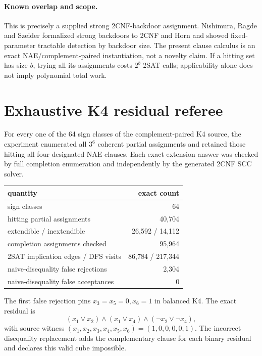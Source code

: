 \documentclass[11pt]{article}
\begin{document}
\paragraph{Known overlap and scope.}
This is precisely a supplied strong 2CNF-backdoor assignment.  Nishimura,
Ragde and Szeider formalized strong backdoors to 2CNF and Horn and showed
fixed-parameter tractable detection by backdoor size.  The present clause
calculus is an exact NAE/complement-paired instantiation, not a novelty claim.
If a hitting set has size $b$, trying all its assignments costs $2^b$ 2SAT
calls; applicability alone does not imply polynomial total work.

\section{Exhaustive K4 residual referee}

For every one of the 64 sign classes of the complement-paired K4 source, the
experiment enumerated all $3^6$ coherent partial assignments and retained
those hitting all four designated NAE clauses.  Each exact extension answer
was checked by full completion enumeration and independently by the generated
2CNF SCC solver.

\begin{center}
\begin{tabular}{lr}
\toprule
quantity & exact count\\
\midrule
sign classes &64\\
hitting partial assignments &40,704\\
extendible / inextendible &26,592 / 14,112\\
completion assignments checked &95,964\\
2SAT implication edges / DFS visits &86,784 / 217,344\\
naive-disequality false rejections &2,304\\
naive-disequality false acceptances &0\\
\bottomrule
\end{tabular}
\end{center}

The first false rejection pins $x_3=x_5=0,x_6=1$ in balanced K4.  The exact
residual is
\[
 (x_1\vee x_2)\wedge(x_1\vee x_4)\wedge
 (\neg x_2\vee\neg x_4),
\]
with source witness $(x_1,x_2,x_3,x_4,x_5,x_6)=(1,0,0,0,0,1)$.
The incorrect disequality replacement adds the complementary clause for each
binary residual and declares this valid cube impossible.
\end{document}
